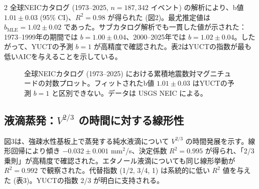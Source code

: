 \documentclass[11pt,a4paper]{article}
\begin{document}
\begin{multicols}{2}
		全球NEICカタログ (1973–2025, \(n = 187,342\) イベント) の解析により、b値 \(1.01 \pm 0.03\) (95\% CI)、\(R^2 = 0.98\) が得られた (図2)。最尤推定値は \(b_{\text{MLE}} = 1.02 \pm 0.02\) であった。サブカタログ解析でも一貫した値が示された：1973–1999年の期間では \(b = 1.00 \pm 0.04\)、2000–2025年では \(b = 1.02 \pm 0.04\)。したがって、YUCTの予測 \(b = 1\) が高精度で確認された。表2はYUCTの指数が最も低いAICを与えることを示している。
		
		\begin{figure}[htbp]
			\centering
			\caption{全球NEICカタログ (1973–2025) における累積地震数対マグニチュードの対数プロット。フィットされたb値 \(1.01 \pm 0.03\) はYUCTの予測 \(b = 1\) と区別できない。データは USGS NEIC \cite{USGSNEIC} による。}
			\label{fig:earthquakes}
		\end{figure}
		
		\subsection{液滴蒸発：\(V^{2/3}\) の時間に対する線形性}
		
		図3は、強疎水性基板上で蒸発する純水液滴について \(V^{2/3}\) の時間発展を示す。線形回帰により傾き \(-0.032 \pm 0.001\) mm\(^2\)/s、決定係数 \(R^2 = 0.995\) が得られ、「2/3乗則」が高精度で確認された。エタノール液滴についても同じ線形挙動が \(R^2 = 0.992\) で観察された。代替指数 (1/2, 3/4, 1) は系統的に低い \(R^2\) 値を与えた (表3)。YUCTの指数 2/3 が明白に支持される。
		

\end{multicols}
\end{document}
